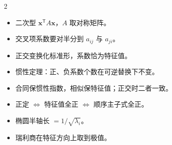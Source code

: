 \documentclass[11pt,a4paper,openany]{ctexbook}
\begin{document}
\begin{chapkeys}
\small
\begin{multicols}{2}
\begin{itemize}[leftmargin=1.5em, itemsep=2pt]
\item 二次型 $\boldsymbol{x}^{\mathsf T}A\boldsymbol{x}$，$A$ 取对称矩阵。
\item 交叉项系数要对半分到 $a_{ij}$ 与 $a_{ji}$。
\item 正交变换化标准形，系数恰为特征值。
\item 惯性定理：正、负系数个数在可逆替换下不变。
\item 合同保惯性指数，相似保特征值；正交时二者一致。
\item 正定 $\Leftrightarrow$ 特征值全正 $\Leftrightarrow$ 顺序主子式全正。
\item 椭圆半轴长 $=1/\sqrt{\lambda_i}$。
\item 瑞利商在特征方向上取到极值。
\end{itemize}
\end{multicols}
\end{chapkeys}
\end{document}
